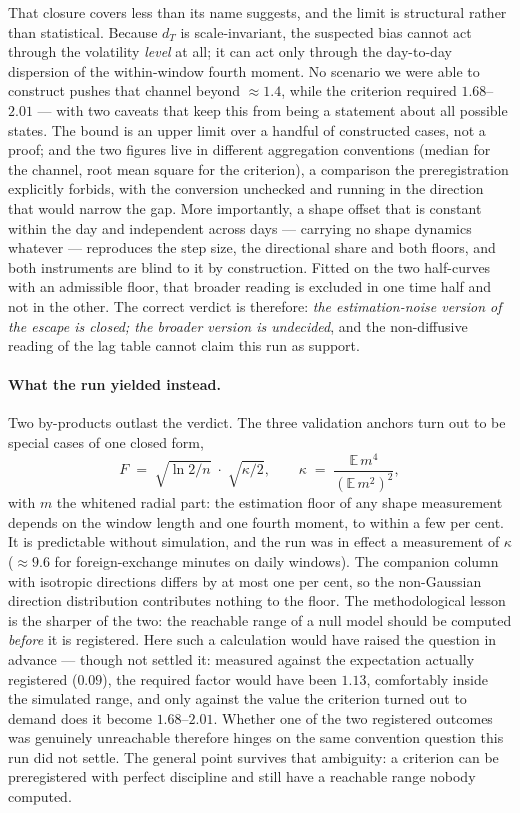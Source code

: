 \documentclass[11pt,a4paper]{article}
\numberwithin{equation}{section}
\begin{document}
That closure covers less than its name suggests, and the limit is
structural rather than statistical. Because $d_T$ is
scale-invariant, the suspected bias cannot act through the
volatility \emph{level} at all; it can act only through the
day-to-day dispersion of the within-window fourth moment. No
scenario we were able to construct pushes that channel beyond
$\approx1.4$, while the criterion required $1.68$--$2.01$ --- with
two caveats that keep this from being a statement about all
possible states. The bound is an upper limit over a handful of
constructed cases, not a proof; and the two figures live in
different aggregation conventions (median for the channel, root
mean square for the criterion), a comparison the preregistration
explicitly forbids, with the conversion unchecked and running in
the direction that would narrow the gap. More importantly, a shape offset that is constant within
the day and independent across days --- carrying no shape dynamics
whatever --- reproduces the step size, the directional share and
both floors, and both instruments are blind to it by construction.
Fitted on the two half-curves with an admissible floor, that
broader reading is excluded in one time half and not in the other.
The correct verdict is therefore: \emph{the estimation-noise
version of the escape is closed; the broader version is
undecided}, and the non-diffusive reading of the lag table cannot
claim this run as support.

\paragraph{What the run yielded instead.} Two by-products outlast
the verdict. The three validation anchors turn out to be special
cases of one closed form,
\begin{equation}
F \;=\; \sqrt{\ln 2 / n}\;\cdot\;\sqrt{\kappa/2},
\qquad
\kappa \;=\; \frac{\mathbb{E}\,m^4}{\left(\mathbb{E}\,m^2\right)^2},
\label{eq:floorkappa}
\end{equation}
with $m$ the whitened radial part: the estimation floor of any
shape measurement depends on the window length and one fourth
moment, to within a few per cent. It is predictable without
simulation,
and the run was in effect a measurement of $\kappa$
($\approx9.6$ for foreign-exchange minutes on daily windows). The
companion column with isotropic directions differs by at most one
per cent, so the non-Gaussian direction distribution contributes
nothing to the floor. The methodological lesson is the sharper of
the two: the reachable range of a null model should be computed
\emph{before} it is registered. Here such a calculation would have
raised the question in advance --- though not settled it: measured
against the expectation actually registered ($0.09$), the required
factor would have been $1.13$, comfortably inside the simulated
range, and only against the value the criterion turned out to
demand does it become $1.68$--$2.01$. Whether one of the two
registered outcomes was genuinely unreachable therefore hinges on
the same convention question this run did not settle. The general
point survives that ambiguity: a criterion can be preregistered
with perfect discipline and still have a reachable range nobody
computed.
\end{document}
